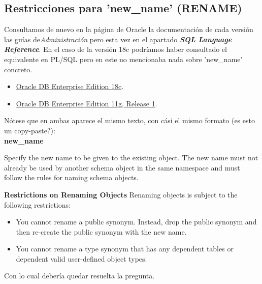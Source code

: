 \documentclass[10pt]{article}
\begin{document}
	\subsection{Restricciones para 'new\_name' (RENAME)}
	
	Consultamos  de nuevo en la página de Oracle la documentación de cada versión las 
	guías de\textit{Administración} pero esta vez en el apartado \textit{\textbf{SQL 
	Language Reference}}. En el caso de la versión 18c podríamos haber consultado el
	equivalente en PL/SQL pero en este no mencionaba nada sobre 'new\_name' concreto.
	    \begin{itemize}
	        \item \href{https://docs.oracle.com/en/database/oracle/oracle-database/18/
	        sqlrf/sql-language-reference.pdf}{Oracle DB Enterprise Edition 18c}.
	        \item \href{https://docs.oracle.com/cd/B28359_01/server.111/b28286/stateme
	        nts_9019.htm#SQLRF01608}{Oracle DB Enterprise Edition 11g, Release 1}.
	    \end{itemize}
    Nótese que en ambas aparece el mismo texto, con cási el mismo formato (es esto un
    copy-paste?):\\
    \textbf{new\_name}
    {Specify the new name to be given to the existing object. The new name must not
    already be used by another schema object in the same namespace and must follow
    the rules for naming schema objects.

    \textbf{Restrictions on Renaming Objects}
    Renaming objects is subject to the following restrictions:
    \begin{itemize}
        \item {You cannot rename a public synonym. Instead, drop the public synonym and
        then re-create the public synonym with the new name.}
        \item {You cannot rename a type synonym that has any dependent tables or 
        dependent valid user-defined object types.}
    \end{itemize}}
    
    Con lo cual debería quedar resuelta la pregunta.
	
\end{document}
